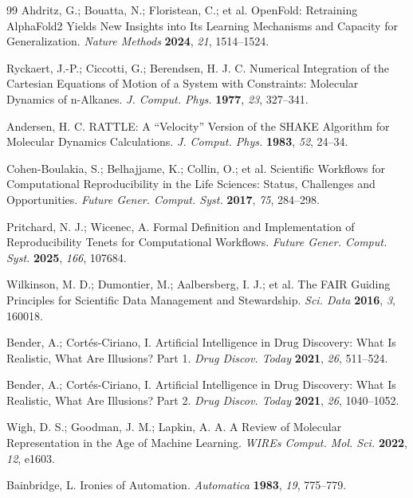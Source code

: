 \documentclass[11pt]{article}
\begin{document}
\begin{thebibliography}{99}
Ahdritz, G.; Bouatta, N.; Floristean, C.; et al.
OpenFold: Retraining AlphaFold2 Yields New Insights into Its Learning Mechanisms and Capacity for Generalization.
\emph{Nature Methods} \textbf{2024}, \emph{21}, 1514--1524.

Ryckaert, J.-P.; Ciccotti, G.; Berendsen, H. J. C.
Numerical Integration of the Cartesian Equations of Motion of a System with Constraints: Molecular Dynamics of n-Alkanes.
\emph{J. Comput. Phys.} \textbf{1977}, \emph{23}, 327--341.

Andersen, H. C.
RATTLE: A ``Velocity'' Version of the SHAKE Algorithm for Molecular Dynamics Calculations.
\emph{J. Comput. Phys.} \textbf{1983}, \emph{52}, 24--34.

Cohen-Boulakia, S.; Belhajjame, K.; Collin, O.; et al.
Scientific Workflows for Computational Reproducibility in the Life Sciences: Status, Challenges and Opportunities.
\emph{Future Gener. Comput. Syst.} \textbf{2017}, \emph{75}, 284--298.

Pritchard, N. J.; Wicenec, A.
Formal Definition and Implementation of Reproducibility Tenets for Computational Workflows.
\emph{Future Gener. Comput. Syst.} \textbf{2025}, \emph{166}, 107684.

Wilkinson, M. D.; Dumontier, M.; Aalbersberg, I. J.; et al.
The FAIR Guiding Principles for Scientific Data Management and Stewardship.
\emph{Sci. Data} \textbf{2016}, \emph{3}, 160018.

Bender, A.; Cort{\'e}s-Ciriano, I.
Artificial Intelligence in Drug Discovery: What Is Realistic, What Are Illusions? Part 1.
\emph{Drug Discov. Today} \textbf{2021}, \emph{26}, 511--524.

Bender, A.; Cort{\'e}s-Ciriano, I.
Artificial Intelligence in Drug Discovery: What Is Realistic, What Are Illusions? Part 2.
\emph{Drug Discov. Today} \textbf{2021}, \emph{26}, 1040--1052.

Wigh, D. S.; Goodman, J. M.; Lapkin, A. A.
A Review of Molecular Representation in the Age of Machine Learning.
\emph{WIREs Comput. Mol. Sci.} \textbf{2022}, \emph{12}, e1603.

Bainbridge, L.
Ironies of Automation.
\emph{Automatica} \textbf{1983}, \emph{19}, 775--779.



\end{thebibliography}
\end{document}
